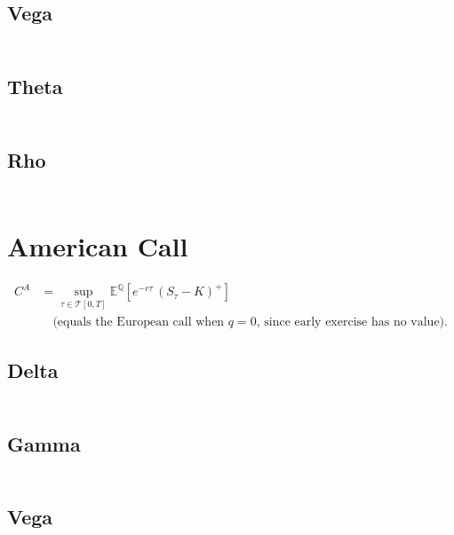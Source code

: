 \documentclass[12pt,a4paper]{article}
\begin{document}
\subsection{Vega}
\[
  \begin{aligned}
  \end{aligned}
\]

\subsection{Theta}
\[
  \begin{aligned}
  \end{aligned}
\]

\subsection{Rho}
\[
  \begin{aligned}
  \end{aligned}
\]

\section{American Call}

\[
  \begin{aligned}
    C^{A} & = \sup_{\tau \in \mathcal{T}[0,T]} \mathbb{E}^{\mathbb{Q}}\!
    \left[ e^{-r \tau}\,(S_{\tau}-K)^{+} \right]                                                   \\
          & \quad \text{(equals the European call when $q=0$, since early exercise has no value).}
  \end{aligned}
\]

\subsection{Delta}
\[
  \begin{aligned}
  \end{aligned}
\]

\subsection{Gamma}
\[
  \begin{aligned}
  \end{aligned}
\]

\subsection{Vega}
\[
  \begin{aligned}
  \end{aligned}
\]
\end{document}
